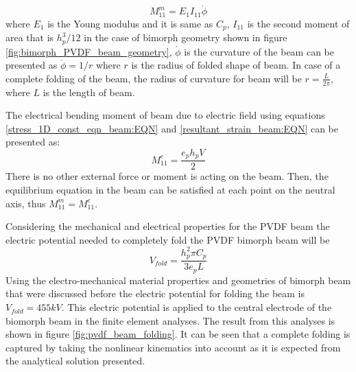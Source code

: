 \begin{equation}
M^m_{11}=E_{1} I_{11} \acute{\phi}
\label{EQN:internal_bending_moment_beam}
\end{equation}
where 
$E_{1}$ is the Young modulus and it is same as $C_p$,
$I_{11}$ is the second moment of area that is $h_p^3/12$ in the case of bimorph geometry shown in figure \ref{fig:bimorph_PVDF_beam_geometry},
$\acute{\phi}$ is the curvature of the beam can be presented as $\acute{\phi}=1/r$ where $r$ is the radius of folded shape of beam.      
In case of a complete folding of the beam, the radius of curvature for beam will be $r=\frac{L}{2\pi}$, where $L$ is the length of beam.

The electrical bending moment of beam due to electric field using equations \ref{stress_1D_const_eqn_beam:EQN} and \ref{resultant_strain_beam:EQN} can be presented as:
\begin{equation}
M^e_{11}=\frac{e_p  h_p  V}{2}
\label{EQN:electric_bending_moment_beam}
\end{equation}
There is no other external force or moment is acting on the beam. 
Then, the equilibrium equation in the beam can be satisfied at each point on the neutral axis, thus $M^m_{11}=M^e_{11}$.
 
Considering the mechanical and electrical properties for the PVDF beam the electric potential needed to completely fold the PVDF bimorph beam will be 
\begin{equation}
V_{fold}=\frac{h_p^2 \pi C_p}{3 e_p L}
\label{EQN:electric_potential_to_fold}
\end{equation}
Using the electro-mechanical material properties and geometries of bimorph beam that were discussed before the electric potential for folding the beam is $V_{fold}=455kV$.
This electric potential is applied to the central electrode of the biomorph beam in the finite element analyses.
The result from this analyses is shown in figure \ref{fig:pvdf_beam_folding}.
It can be seen that a complete folding is captured by taking the nonlinear kinematics into account as it is expected from the analytical solution presented.
\\  
 
